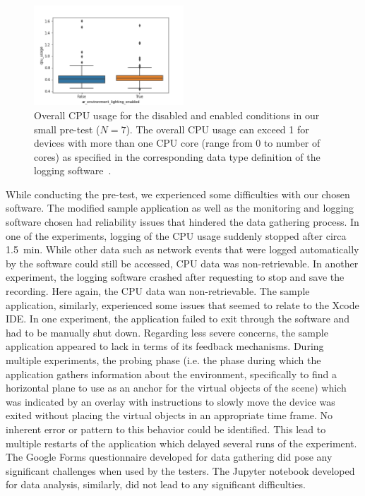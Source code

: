 \documentclass[12pt,twoside,english]{article}
\begin{document}
\begin{figure}[h]
    \centering
    \includegraphics[width=0.5\textwidth]{imgs/cpu_raw_plot}
    \caption{Overall \gls{CPU} usage for the disabled and enabled conditions in our small pre-test ($ N = 7 $). The overall \gls{CPU} usage can exceed 1 for devices with more than one \gls{CPU} core (range from 0 to number of cores) as specified in the corresponding data type definition of the logging software~\cite{apple_system_2020}.}
    \label{fig:cpu_raw_plot}
\end{figure}

While conducting the pre-test, we experienced some difficulties with our chosen software.
The modified sample application as well as the monitoring and logging software chosen had reliability issues that hindered the data gathering process.
In one of the experiments, logging of the \gls{CPU} usage suddenly stopped after circa 1.5~min.
While other data such as network events that were logged automatically by the software could still be accessed, \gls{CPU} data was non-retrievable.
In another experiment, the logging software crashed after requesting to stop and save the recording.
Here again, the \gls{CPU} data wan non-retrievable.
The sample application, similarly, experienced some issues that seemed to relate to the Xcode \gls{IDE}.
In one experiment, the application failed to exit through the software and had to be manually shut down.
Regarding less severe concerns, the sample application appeared to lack in terms of its feedback mechanisms.
During multiple experiments, the probing phase (i.e. the phase during which the application gathers information about the environment, specifically to find a horizontal plane to use as an anchor for the virtual objects of the scene) which was indicated by an overlay with instructions to slowly move the device was exited without placing the virtual objects in an appropriate time frame.
No inherent error or pattern to this behavior could be identified.
This lead to multiple restarts of the application which delayed several runs of the experiment.
The Google Forms questionnaire developed for data gathering did pose any significant challenges when used by the testers.
The Jupyter notebook developed for data analysis, similarly, did not lead to any significant difficulties.
\end{document}
